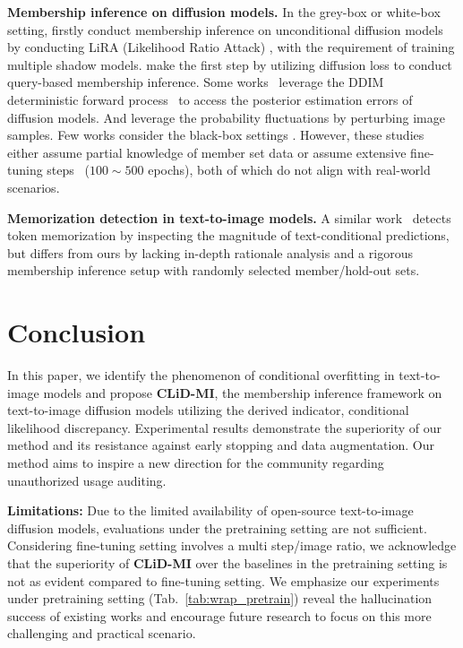 \documentclass{article}
\theoremstyle{plain}
\theoremstyle{remark}
\begin{document}
\textbf{Membership inference on diffusion models.} 
In the grey-box or white-box setting, \citet{carlini2023extracting} firstly conduct membership inference on unconditional diffusion models by conducting LiRA (Likelihood Ratio Attack) \cite{carlini2022membership}, with the requirement of training multiple shadow models. \citet{matsumoto2023membership} make the first step by utilizing diffusion loss to conduct query-based membership inference. Some works~\cite{duan2023diffusion, kong2023efficient} leverage the DDIM~\cite{song2020denoising} deterministic forward process~\cite{kim2022diffusionclip} to access the posterior estimation errors of diffusion models. And \citet{fu2023probabilistic} leverage the probability fluctuations by perturbing image samples. Few works consider the black-box settings \cite{wu2022membership, pang2023black}. However, these studies either assume partial knowledge of member set data \cite{wu2022membership} or assume extensive fine-tuning steps~\cite{pang2023black} ($100 \sim 500$ epochs), both of which do not align with real-world scenarios.

\textbf{Memorization detection in text-to-image models.}
A similar work~\cite{wen2024detecting} 
detects token memorization by inspecting the magnitude of text-conditional predictions, 
but differs from ours by lacking in-depth rationale analysis and a rigorous membership inference setup with randomly selected member/hold-out sets.


\vspace{-3pt}
\section{Conclusion}\label{sec:conclusion}
\vspace{-3pt}
In this paper, we identify the phenomenon of conditional overfitting in text-to-image models and propose \textbf{CLiD-MI}, the membership inference framework on text-to-image diffusion models utilizing the derived indicator, conditional likelihood discrepancy. Experimental results demonstrate the superiority of our method and its resistance against early stopping and data augmentation. Our method aims to inspire a new direction for the community regarding unauthorized usage auditing.

\textbf{Limitations:} 
Due to the limited availability of open-source text-to-image diffusion models, evaluations under the pretraining setting are not sufficient. Considering fine-tuning setting involves a multi step/image ratio, 
we acknowledge that the superiority of \textbf{CLiD-MI} over the baselines in the pretraining setting  is not as evident compared to fine-tuning setting.
We emphasize our experiments under pretraining setting (Tab.~\ref{tab:wrap_pretrain}) reveal the hallucination success of existing works and encourage future research to focus on this more challenging and practical scenario.
\end{document}
